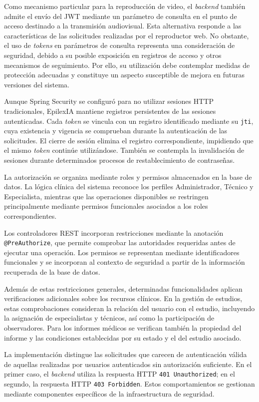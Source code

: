 Como mecanismo particular para la reproducción de video,
el \textit{backend} también admite el envío del JWT mediante un
parámetro de consulta en el punto de acceso destinado
a la transmisión audiovisual. Esta alternativa responde
a las características de las solicitudes realizadas por
el reproductor web. No obstante, el uso de \textit{tokens} en
parámetros de consulta representa una consideración
de seguridad, debido a su posible exposición en registros
de acceso y otros mecanismos de seguimiento. Por ello,
su utilización debe contemplar medidas de protección
adecuadas y constituye un aspecto susceptible de mejora
en futuras versiones del sistema.


Aunque Spring Security se configuró para no utilizar
sesiones HTTP tradicionales, EpilexIA mantiene registros
persistentes de las sesiones autenticadas. Cada \textit{token}
se vincula con un registro identificado mediante su
\texttt{jti}, cuya existencia y vigencia se comprueban
durante la autenticación de las solicitudes. El cierre
de sesión elimina el registro correspondiente, impidiendo
que el mismo \textit{token} continúe utilizándose. También se
contempla la invalidación de sesiones durante determinados
procesos de restablecimiento de contraseñas.

La autorización se organiza mediante roles y permisos
almacenados en la base de datos. La lógica clínica del
sistema reconoce los perfiles Administrador, Técnico
y Especialista, mientras que las operaciones disponibles
se restringen principalmente mediante permisos
funcionales asociados a los roles correspondientes.

Los controladores REST incorporan restricciones mediante
la anotación \texttt{@PreAuthorize}, que permite comprobar
las autoridades requeridas antes de ejecutar una operación.
Los permisos se representan mediante identificadores
funcionales y se incorporan al contexto de seguridad
a partir de la información recuperada de la base de datos.

Además de estas restricciones generales, determinadas
funcionalidades aplican verificaciones adicionales sobre
los recursos clínicos. En la gestión de estudios, estas
comprobaciones consideran la relación del usuario con
el estudio, incluyendo la asignación de especialistas
y técnicos, así como la participación de observadores.
Para los informes médicos se verifican también la
propiedad del informe y las condiciones establecidas
por su estado y el del estudio asociado.

La implementación distingue las solicitudes que carecen
de autenticación válida de aquellas realizadas por
usuarios autenticados sin autorización suficiente.
En el primer caso, el \textit{backend} utiliza la respuesta HTTP
\texttt{401 Unauthorized}; en el segundo, la respuesta
HTTP \texttt{403 Forbidden}. Estos comportamientos
se gestionan mediante componentes específicos de
la infraestructura de seguridad.


